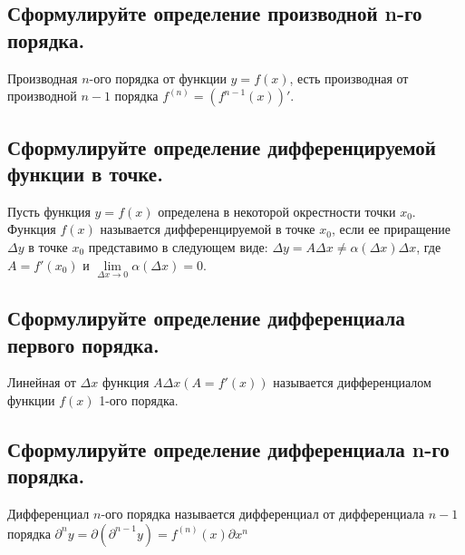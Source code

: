 

\subsection{Сформулируйте определение производной n-го порядка.}

Производная $n$-ого порядка от функции $y = f(x)$, есть производная от производной $n-1$ порядка $f^{(n)} = (f^{n-1}(x))'$.



\subsection{Сформулируйте определение дифференцируемой функции в точке.}

Пусть функция $y = f(x)$ определена в некоторой окрестности точки $x_0$. Функция $f(x)$ называется дифференцируемой в точке $x_0$, если ее приращение $\Delta y$ в точке $x_0$ представимо в следующем виде: $\Delta y = A\Delta x \ne \alpha(\Delta x)\Delta x$, где $A = f'(x_0)$ и $\lim\limits_{\Delta x \to 0}\alpha (\Delta x) = 0$.



\subsection{Сформулируйте определение дифференциала первого порядка.}

Линейная от $\Delta x$ функция $A \Delta x (A = f'(x))$ называется дифференциалом функции $f(x)$ 1-ого порядка.



\subsection{Сформулируйте определение дифференциала n-го порядка.}

Дифференциал $n$-ого порядка называется дифференциал от дифференциала $n - 1$ порядка $\partial^ny = \partial(\partial^{n-1}y) = f^{(n)}(x)\partial x^n$


  
